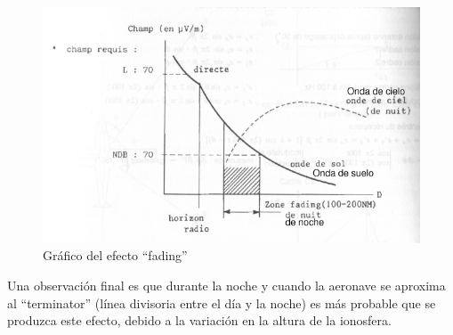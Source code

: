\begin{description}
\begin{description}
\begin{figure}[!htb]
  \centering
  \includegraphics[width=\textwidth]{Imagenes/06.01.adf/grafico-fading.png}
  \caption{ Gr\'afico del efecto ``fading''}
  \label{fig:fading}
\end{figure}

Una observaci\'on final es que durante la noche y cuando la aeronave se aproxima al ``terminator'' (l\'inea divisoria entre el d\'ia y la noche) es m\'as probable que se produzca este efecto, debido a la variaci\'on en la altura de la ionosfera.
\end{description}

\end{description}


